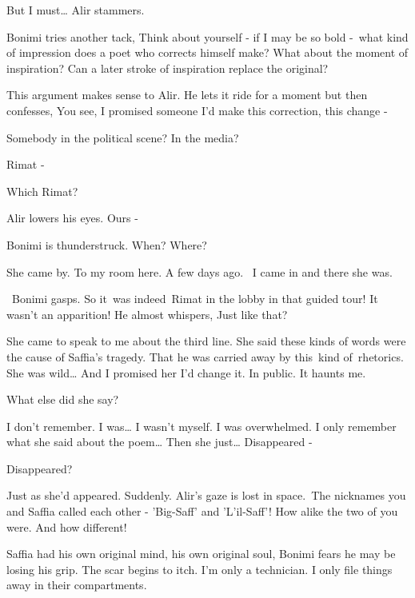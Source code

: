 \documentclass[twoside,11pt]{book}
\begin{document}
{\textquotedbl}But I must{\dots}{\textquotedbl} Alir stammers. 

Bonimi tries another tack, {\textquotedbl}Think about yourself - if I may be so bold -\ what kind of impression does a
poet who corrects himself make? What about the moment of inspiration? Can a later stroke of inspiration replace the
original?{\textquotedbl} 

This argument makes sense to Alir. He lets it ride for a moment but then confesses, {\textquotedbl}You see, I promised
someone I'd make this correction, this change -{\textquotedbl} 

{\textquotedbl}Somebody in the political scene? In the media?{\textquotedbl} 

{\textquotedbl}Rimat -{\textquotedbl} 

{\textquotedbl}Which Rimat?{\textquotedbl} 

Alir lowers his eyes. {\textquotedbl}Ours -{\textquotedbl} 

Bonimi is thunderstruck. {\textquotedbl}When? Where?{\textquotedbl}

{\textquotedbl}She came by. To my room here. A few days ago. ~I came in and there she was.{\textquotedbl}\ 

~Bonimi gasps. So it\ was indeed~Rimat in the lobby in that guided tour! It wasn't an apparition! He almost whispers,
{\textquotedbl}Just like that?{\textquotedbl} 

{\textquotedbl}She came to speak to me about the third line. She said these kinds of words were the cause of Saffia's
tragedy. That he was carried away by this~kind of{\ }rhetorics. She was wild{\dots} And I promised her
I'd change it. In public. It haunts me.{\textquotedbl} 

{\textquotedbl}What else did she say?{\textquotedbl} 

{\textquotedbl}I don't remember. I was{\dots} I wasn't myself. I was overwhelmed. I only remember what she said about
the poem{\dots} Then she just{\dots} Disappeared -{\textquotedbl} 

{\textquotedbl}Disappeared?{\textquotedbl} 

{\textquotedbl}Just as she'd appeared. Suddenly.{\textquotedbl} Alir's gaze is lost in space.\ {\textquotedbl}The
nicknames you and Saffia called each other - 'Big-Saff' and 'L'il-Saff'! How alike the two of you were. And how
different!{\textquotedbl} 

{\textquotedbl}Saffia had his own original mind, his own original soul,{\textquotedbl} Bonimi fears he may be losing his
grip. The scar begins to itch. {\textquotedbl}I'm only a technician. I only file things away in their
compartments.{\textquotedbl}
\end{document}
